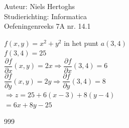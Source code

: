 \documentclass[a4paper]{article}
\begin{document}
	
\noindent \large Auteur: Niels Hertoghs \\
\noindent \large Studierichting:  Informatica\\
\noindent \large Oefeningenreeks 7A nr. 14.1\\


\medskip

\normalsize


$f(x,y) = x^2 + y^2 $ in het punt $a(3,4)$\\

$f(3,4) = 25$\\

$\dfrac{\partial f}{\partial x}(x,y) = 2x \Rightarrow \dfrac{\partial f}{\partial x}(3,4) = 6$\\

$\dfrac{\partial f}{\partial y}(x,y) = 2y \Rightarrow \dfrac{\partial f}{\partial y}(3,4) = 8$\\

$\Rightarrow z = 25 + 6(x-3) + 8(y-4)$\\

$ = 6x +8y -25$\\

\begin{thebibliography}{999}
\end{thebibliography}
\end{document}
